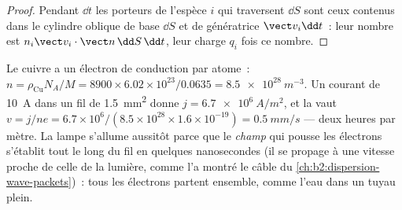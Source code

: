 \begin{proof}
Pendant $\dd t$ les porteurs de l'espèce $i$ qui traversent $\dd S$ sont ceux contenus dans
le cylindre oblique de base $\dd S$ et de génératrice $\vect v_i\dd t$~: leur nombre est
$n_i\vect v_i\cdot\vect n\,\dd S\,\dd t$, leur charge $q_i$ fois ce nombre.
\end{proof}

\begin{example}\label{ex:b2:charges-currents-conduction:drift}
Le cuivre a un électron de conduction par atome~: $n = \rho_{\text{Cu}}N_A/M =
8900 \times 6.02 \times 10^{23}/0.0635 = \qty{8.5e28}{m^{-3}}$. Un courant de
\qty{10}{A} dans un fil de \qty{1.5}{mm^2} donne $j = \qty{6.7e6}{A/m^2}$, et la
\emph{} vaut $v = j/ne = 6.7 \times 10^6/(8.5 \times 10^{28} \times 1.6 \times
10^{-19}) = \qty{0.5}{mm/s}$ --- deux heures par mètre. La lampe s'allume
aussitôt parce que le \emph{champ} qui pousse les électrons s'établit
tout le long du fil en quelques nanosecondes (il se propage à une vitesse proche de celle
de la lumière, comme l'a montré le câble du \cref{ch:b2:dispersion-wave-packets})~:
tous les électrons partent ensemble, comme l'eau dans un tuyau plein.
\end{example}

